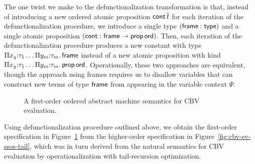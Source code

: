The one twist we make to the defunctionalization transformation is
that, instead of introducing a new ordered atomic proposition ${\sf
  cont}\,\overline{t}$ for each iteration of the defunctionalization
procedure, we introduce a single type $({\sf frame} : {\sf type})$ and a
single atomic proposition $({\sf cont} : {\sf frame} \rightarrow {\sf
  prop\,ord})$. Then, each iteration of the defunctionalization
procedure produces a new constant with type $\Pi x_y{:}\tau_1\ldots
\Pi y_m{:}\tau_m.\, {\sf frame}$ instead of a new atomic proposition
with kind $\Pi x_y{:}\tau_1\ldots \Pi y_m{:}\tau_m.\, {\sf
  prop\,ord}$.  Operationally, these two approaches are equivalent,
though the approach using frames requires us to disallow variables
that can construct new terms of type ${\sf frame}$ from appearing in
the variable context $\Psi$.

\begin{figure}
\caption{A first-order ordered abstract machine semantics for CBV
  evaluation.}
\label{fig:cbv-ev-ssos-fun}
\end{figure}

Using defunctionalization procedure outlined above, we obtain the
first-order specification in Figure~\ref{fig:cbv-ev-ssos-fun} from the
higher-order specification in Figure~\ref{fig:cbv-ev-ssos-tail}, which
was in turn derived from the natural semantics for CBV evaluation by
operationalization with tail-recursion optimization.





